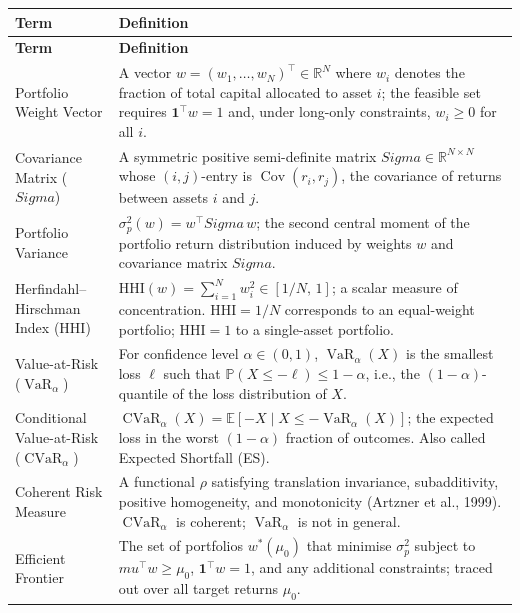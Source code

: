 \documentclass[12pt,openany]{book}
\newcommand{\R}{\mathbb{R}}
\newcommand{\E}{\mathbb{E}}
\newcommand{\Prob}{\mathbb{P}}
\newcommand{\bfw}{\mathbf{w}}
\newcommand{\bfmu}{\boldsymbol{\mu}}
\newcommand{\bfSigma}{\boldsymbol{\Sigma}}
\newcommand{\bfone}{\mathbf{1}}
\DeclareMathOperator{\Cov}{Cov}
\DeclareMathOperator{\CVaR}{CVaR}
\DeclareMathOperator{\VaR}{VaR}
\numberwithin{equation}{chapter}
\theoremstyle{plain}
\theoremstyle{definition}
\theoremstyle{remark}
\def\bfw{w}%
\def\bfmu{mu}%
\def\bfSigma{Sigma}%
\begin{document}
{\small
\begin{longtable}{@{} p{4.2cm} >{\raggedright\arraybackslash}p{\dimexpr\linewidth-4.2cm-2\tabcolsep\relax} @{}}
\hline
\textbf{Term} & \textbf{Definition} \\
\hline
\endfirsthead
\hline
\textbf{Term} & \textbf{Definition} \\
\hline
\endhead
\endfoot
Portfolio Weight Vector &
  A vector $\bfw = (w_1,\ldots,w_N)^\top \in \R^N$ where $w_i$ denotes
  the fraction of total capital allocated to asset $i$; the feasible
  set requires $\bfone^\top\bfw = 1$ and, under long-only constraints,
  $w_i \ge 0$ for all $i$. \\
\addlinespace
Covariance Matrix ($\bfSigma$) &
  A symmetric positive semi-definite matrix $\bfSigma \in \R^{N\times N}$
  whose $(i,j)$-entry is $\Cov(r_i, r_j)$, the covariance of returns
  between assets $i$ and $j$. \\
\addlinespace
Portfolio Variance &
  $\sigma_p^2(\bfw) = \bfw^\top \bfSigma\, \bfw$; the second central
  moment of the portfolio return distribution induced by weights $\bfw$
  and covariance matrix $\bfSigma$. \\
\addlinespace
Herfindahl--Hirschman Index (HHI) &
  $\mathrm{HHI}(\bfw) = \sum_{i=1}^{N} w_i^2 \in [1/N,\,1]$; a scalar
  measure of concentration.  $\mathrm{HHI} = 1/N$ corresponds to an
  equal-weight portfolio; $\mathrm{HHI} = 1$ to a single-asset
  portfolio. \\
\addlinespace
Value-at-Risk ($\VaR_\alpha$) &
  For confidence level $\alpha \in (0,1)$, $\VaR_\alpha(X)$ is the
  smallest loss $\ell$ such that $\Prob(X \le -\ell) \le 1-\alpha$,
  i.e., the $(1-\alpha)$-quantile of the loss distribution of $X$. \\
\addlinespace
Conditional Value-at-Risk ($\CVaR_\alpha$) &
  $\CVaR_\alpha(X) = \E[-X \mid X \le -\VaR_\alpha(X)]$; the expected
  loss in the worst $(1-\alpha)$ fraction of outcomes.  Also called
  Expected Shortfall (ES). \\
\addlinespace
Coherent Risk Measure &
  A functional $\rho$ satisfying translation invariance, subadditivity,
  positive homogeneity, and monotonicity (Artzner et al., 1999).
  $\CVaR_\alpha$ is coherent; $\VaR_\alpha$ is not in general. \\
\addlinespace
Efficient Frontier &
  The set of portfolios $\bfw^*(\mu_0)$ that minimise $\sigma_p^2$
  subject to $\bfmu^\top\bfw \ge \mu_0$, $\bfone^\top\bfw = 1$, and
  any additional constraints; traced out over all target returns
  $\mu_0$. \\

\end{longtable}}
\end{document}
